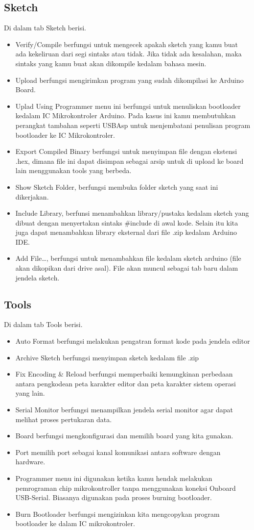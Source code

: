 \subsection{Sketch}
Di dalam tab Sketch berisi.
\begin{itemize}
\item Verify/Compile berfungsi untuk mengecek apakah sketch yang kamu buat ada kekeliruan dari segi sintaks atau tidak. Jika tidak ada kesalahan, maka sintaks yang kamu buat akan dikompile kedalam bahasa mesin.
\item Upload berfungsi mengirimkan program yang sudah dikompilasi ke Arduino Board.
\item Uplad Using Programmer menu ini berfungsi untuk menuliskan bootloader kedalam IC Mikrokontroler Arduino. Pada kasus ini kamu membutuhkan perangkat tambahan seperti USBAsp untuk menjembatani penulisan program bootloader ke IC Mikrokontroler.
\item Export Compiled Binary berfungsi untuk menyimpan file dengan ekstensi .hex, dimana file ini dapat disimpan sebagai arsip untuk di upload ke board lain menggunakan tools yang berbeda.
\item Show Sketch Folder, berfungsi membuka folder sketch yang saat ini dikerjakan.
\item Include Library, berfunsi menambahkan library/pustaka kedalam sketch yang dibuat dengan menyertakan sintaks \#include di awal kode. Selain itu kita juga dapat menambahkan library eksternal dari file .zip kedalam Arduino IDE.
\item Add File…, berfungsi untuk menambahkan file kedalam sketch arduino (file akan dikopikan dari drive asal). 
File akan muncul sebagai tab baru dalam jendela sketch.
\end{itemize}
\subsection{Tools}
Di dalam tab Tools berisi.
\begin{itemize}
\item Auto Format berfungsi melakukan pengatran format kode pada jendela editor
\item Archive Sketch berfungsi menyimpan sketch kedalam file .zip
\item Fix Encoding \& Reload berfungsi memperbaiki kemungkinan perbedaan antara pengkodean peta karakter editor dan peta karakter sistem operasi yang lain.
\item Serial Monitor berfungsi menampilkan jendela serial monitor agar dapat melihat proses pertukaran data.
\item Board berfungsi mengkonfigurasi dan memilih board yang kita gunakan.
\item Port memilih port sebagai kanal komunikasi antara software dengan hardware.
\item Programmer menu ini digunakan ketika kamu hendak melakukan pemrograman chip mikrokontroller tanpa menggunakan koneksi Onboard USB-Serial. Biasanya digunakan pada proses burning bootloader.
\item Burn Bootloader berfungsi mengizinkan kita mengcopykan program bootloader ke dalam IC mikrokontroler.
\end{itemize}

